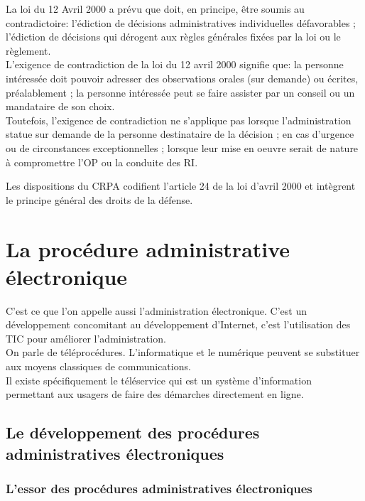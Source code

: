 \documentclass[10pt, a4paper, openany]{book}
\begin{document}
La loi du 12 Avril 2000 a prévu que doit, en principe, être soumis au contradictoire: l'édiction de décisions administratives individuelles défavorables ; l'édiction de décisions qui dérogent aux règles générales fixées par la loi ou le règlement. \\
L'exigence de contradiction de la loi du 12 avril 2000 signifie que: la personne intéressée doit pouvoir adresser des observations orales (sur demande) ou écrites, préalablement ; la personne intéressée peut se faire assister par un conseil ou un mandataire de son choix. \\
Toutefois, l'exigence de contradiction ne s'applique pas lorsque l'administration statue sur demande de la personne destinataire de la décision ; en cas d'urgence ou de circonstances exceptionnelles ; lorsque leur mise en oeuvre serait de nature à compromettre l'OP ou la conduite des RI. 


Les dispositions du CRPA codifient l'article 24 de la loi d'avril 2000 et intègrent le principe général des droits de la défense. 

\section{La procédure administrative électronique}

C'est ce que l'on appelle aussi l'administration électronique. C'est un développement concomitant au développement d'Internet, c'est l'utilisation des TIC pour améliorer l'administration. \\
On parle de téléprocédures. L'informatique et le numérique peuvent se substituer aux moyens classiques de communications. \\
Il existe spécifiquement le téléservice qui est un système d'information permettant aux usagers de faire des démarches directement en ligne. 

\subsection{Le développement des procédures administratives électroniques}

\subsubsection{L'essor des procédures administratives électroniques}
\end{document}
